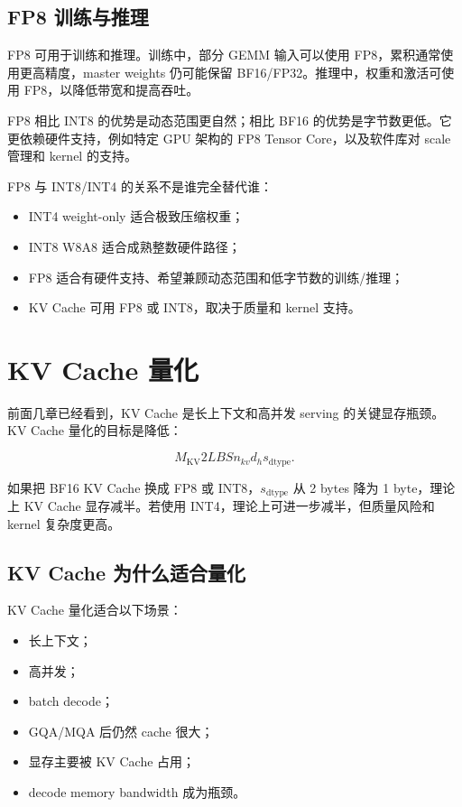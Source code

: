 \subsection{FP8 训练与推理}
\label{subsec:fp8-training-inference}

FP8 可用于训练和推理。训练中，部分 GEMM 输入可以使用 FP8，累积通常使用更高精度，master weights 仍可能保留 BF16/FP32。推理中，权重和激活可使用 FP8，以降低带宽和提高吞吐。

FP8 相比 INT8 的优势是动态范围更自然；相比 BF16 的优势是字节数更低。它更依赖硬件支持，例如特定 GPU 架构的 FP8 Tensor Core，以及软件库对 scale 管理和 kernel 的支持。

FP8 与 INT8/INT4 的关系不是谁完全替代谁：

\begin{itemize}
\item INT4 weight-only 适合极致压缩权重；
\item INT8 W8A8 适合成熟整数硬件路径；
\item FP8 适合有硬件支持、希望兼顾动态范围和低字节数的训练/推理；
\item KV Cache 可用 FP8 或 INT8，取决于质量和 kernel 支持。
\end{itemize}

\section{KV Cache 量化}
\label{sec:kv-cache-quantization}

前面几章已经看到，KV Cache 是长上下文和高并发 serving 的关键显存瓶颈。KV Cache 量化的目标是降低：

\[
M_{\mathrm{KV}}
2LBSn_{kv}d_hs_{\mathrm{dtype}}.
\]

如果把 BF16 KV Cache 换成 FP8 或 INT8，$s_{\mathrm{dtype}}$ 从 2 bytes 降为 1 byte，理论上 KV Cache 显存减半。若使用 INT4，理论上可进一步减半，但质量风险和 kernel 复杂度更高。

\subsection{KV Cache 为什么适合量化}
\label{subsec:why-kv-cache-quantization}

KV Cache 量化适合以下场景：

\begin{itemize}
\item 长上下文；
\item 高并发；
\item batch decode；
\item GQA/MQA 后仍然 cache 很大；
\item 显存主要被 KV Cache 占用；
\item decode memory bandwidth 成为瓶颈。
\end{itemize}

